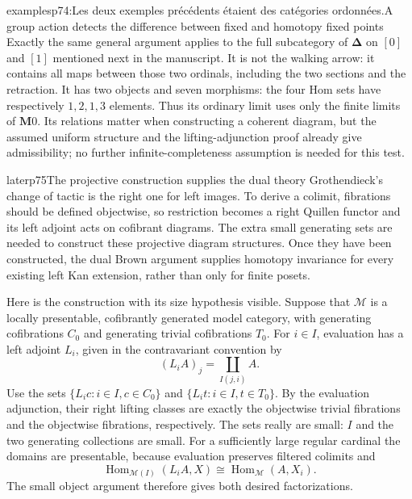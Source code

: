 \begin{dcomment}{examples}{p74:Les deux exemples précédents étaient des catégories ordonnées.}{A group action detects the difference between fixed and homotopy fixed points}
Exactly the same general argument applies to the full subcategory of $\boldsymbol\Delta$ on $[0]$ and $[1]$ mentioned next in the manuscript. It is not the walking arrow: it contains all maps between those two ordinals, including the two sections and the retraction. It has two objects and seven morphisms: the four Hom sets have respectively $1,2,1,3$ elements. Thus its ordinary limit uses only the finite limits of $\mathbf M0$. Its relations matter when constructing a coherent diagram, but the assumed uniform structure and the lifting-adjunction proof already give admissibility; no further infinite-completeness assumption is needed for this test.
\end{dcomment}

\begin{dcomment}{later}{p75}{The projective construction supplies the dual theory}
Grothendieck's change of tactic is the right one for left images. To derive a colimit, fibrations should be defined objectwise, so restriction becomes a right Quillen functor and its left adjoint acts on cofibrant diagrams. The extra small generating sets are needed to construct these projective diagram structures. Once they have been constructed, the dual Brown argument supplies homotopy invariance for every existing left Kan extension, rather than only for finite posets.

Here is the construction with its size hypothesis visible. Suppose that $\mathcal M$ is a locally presentable, cofibrantly generated model category, with generating cofibrations $C_0$ and generating trivial cofibrations $T_0$. For $i\in I$, evaluation has a left adjoint $L_i$, given in the contravariant convention by
\[
                         (L_iA)_j=\coprod_{I(j,i)}A.
\]
Use the sets $\{L_ic:i\in I,c\in C_0\}$ and $\{L_it:i\in I,t\in T_0\}$. By the evaluation adjunction, their right lifting classes are exactly the objectwise trivial fibrations and the objectwise fibrations, respectively. The sets really are small: $I$ and the two generating collections are small. For a sufficiently large regular cardinal the domains are presentable, because evaluation preserves filtered colimits and
\[
 \operatorname{Hom}_{\mathcal M(I)}(L_iA,X)
                        \cong\operatorname{Hom}_{\mathcal M}(A,X_i).
\]
The small object argument therefore gives both desired factorizations.


\end{dcomment}
